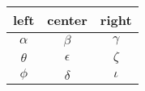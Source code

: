 \documentclass{article}
\begin{document}
\begin{tabular}{|c|c|c|}
\hline
left & center & right \\
\hline
$\alpha$ & $\beta$ & $\gamma$ \\
\hline
$\theta$ & $\epsilon$ & $\zeta$ \\
\hline
$\phi$ & $\delta$ & $\iota$ \\
\hline
\end{tabular}
\end{document}
